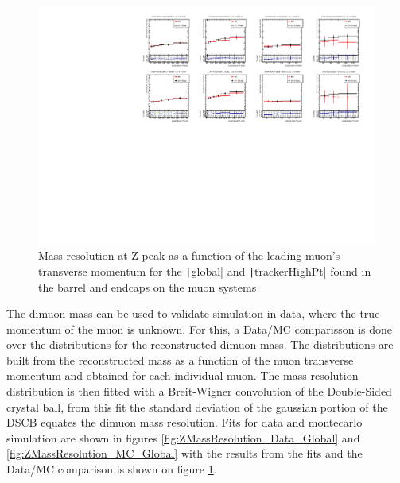 \begin{figure}[tph]
  \centering
  \includegraphics[width=.9\textwidth]{fig/MomentumResolution/2016_ZPeakResolution_Summary.pdf}
  \caption{Mass resolution at Z peak as a function of the leading muon's transverse
    momentum for the \texttt|global| and \texttt|trackerHighPt| found in the barrel and endcaps
    on the muon systems}
  \label{fig:ZMassResolution_Summary}
\end{figure}

The dimuon mass can be used to validate simulation in data, where the true momentum
of the muon is unknown. For this, a Data/MC comparisson is done over the
distributions for the reconstructed dimuon mass. The distributions are built
from the reconstructed mass as a function of the muon transverse momentum and
obtained for each individual muon. The mass resolution distribution is then fitted with
a Breit-Wigner convolution of the Double-Sided crystal ball, from this fit the
standard deviation of the gaussian portion of the DSCB equates the dimuon
mass resolution. Fits for data and montecarlo simulation are shown in figures
\ref{fig:ZMassResolution_Data_Global} and \ref{fig:ZMassResolution_MC_Global}
with the results from the fits and the Data/MC comparison is shown on figure
\ref{fig:ZMassResolution_Summary}.

